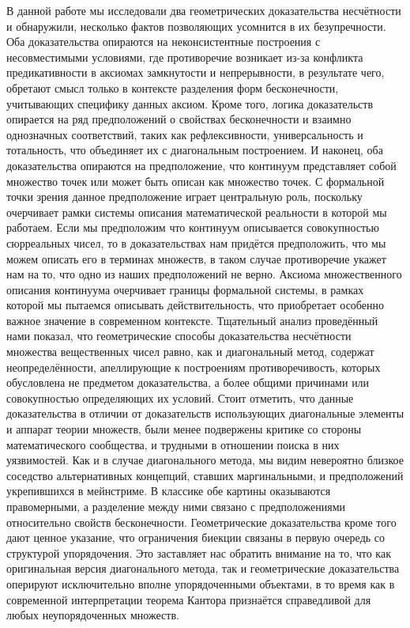 \documentclass[12pt]{article}
\begin{document}
В данной работе мы исследовали два геометрических доказательства несчётности и обнаружили, несколько фактов позволяющих усомнится в их безупречности. Оба доказательства опираются на неконсистентные построения с несовместимыми условиями, где противоречие возникает из-за конфликта предикативности в аксиомах замкнутости и непрерывности, в результате чего, обретают смысл только в контексте разделения форм бесконечности, учитывающих специфику данных аксиом. Кроме того, логика доказательств опирается на ряд предположений о свойствах бесконечности и взаимно однозначных соответствий, таких как рефлексивности, универсальность и тотальность, что объединяет их с диагональным построением. И наконец, оба доказательства опираются на предположение, что континуум представляет собой множество точек или может быть описан как множество точек. С формальной точки зрения данное предположение играет центральную роль, поскольку очерчивает рамки системы описания математической реальности в которой мы работаем. Если мы предположим что континуум описывается совокупностью сюрреальных чисел, то в доказательствах нам придётся предположить, что мы можем описать его в терминах множеств, в таком случае противоречие укажет нам на то, что одно из наших предположений не верно. Аксиома множественного описания континуума очерчивает границы формальной системы, в рамках которой мы пытаемся описывать действительность, что приобретает особенно важное значение в современном контексте. Тщательный анализ проведённый нами показал, что геометрические способы доказательства несчётности множества вещественных чисел равно, как и диагональный метод, содержат неопределённости, апеллирующие к построениям противоречивость, которых обусловлена не предметом доказательства, а более общими причинами или совокупностью определяющих их условий. Стоит отметить, что данные доказательства в отличии от доказательств использующих диагональные элементы и аппарат теории множеств, были менее подвержены критике со стороны математического сообщества, и трудными в отношении поиска в них уязвимостей. Как и в случае диагонального метода, мы видим невероятно близкое соседство альтернативных концепций, ставших маргинальными, и предположений укрепившихся в мейнстриме. В классике обе картины оказываются правомерными, а разделение между ними связано с предположениями относительно свойств бесконечности. Геометрические доказательства кроме того дают ценное указание, что ограничения биекции связаны в первую очередь со структурой упорядочения. Это заставляет нас обратить внимание на то, что как оригинальная версия диагонального метода, так и геометрические доказательства оперируют исключительно вполне упорядоченными объектами, в то время как в современной интерпретации теорема Кантора признаётся справедливой для любых неупорядоченных множеств.

\printbibliography

 
\end{document}
